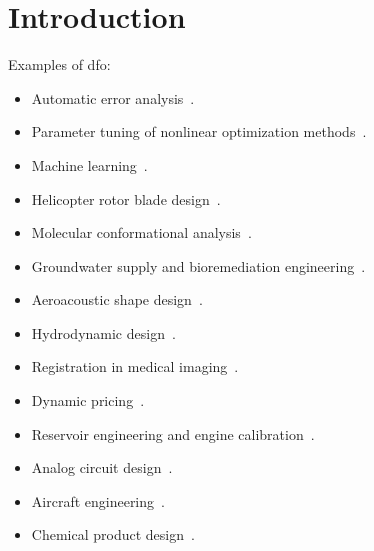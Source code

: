 \chapter{Introduction}

%
%
%

Examples of \gls{dfo}:
\begin{itemize}
    \item Automatic error analysis~\cite{Higham_1993,Higham_2002}.
    \item Parameter tuning of nonlinear optimization methods~\cite{Audet_Orban_2006}.
    \item Machine learning~\cite{Ghanbari_Scheinberg_2017,Qian_Yu_2021}.
    \item Helicopter rotor blade design~\cite{Booker_Etal_1998a,Booker_Etal_1998b,Serafini_1998}.
    \item Molecular conformational analysis~\cite{Alberto_Etal_2004,Meza_Martinez_1994}.
    \item Groundwater supply and bioremediation engineering~\cite{Fowler_Etal_2008,Mugunthan_Shoemaker_Regis_2005,Yoon_Shoemaker_1999}.
    \item Aeroacoustic shape design~\cite{Marsden_2004,Marsden_Etal_2004}.
    \item Hydrodynamic design~\cite{Duvigneau_Visonneau_2004}.
    \item Registration in medical imaging~\cite{Oeuvray_2005,Oeuvray_Bierlaire_2007}.
    \item Dynamic pricing~\cite{Levina_Etal_2009}.
    \item Reservoir engineering and engine calibration~\cite{Langouet_2011}.
    \item Analog circuit design~\cite{Latorre_Etal_2019}.
    \item Aircraft engineering~\cite{Gazaix_Etal_2019}.
    \item Chemical product design~\cite{Sun_Etal_2020}.
\end{itemize}
